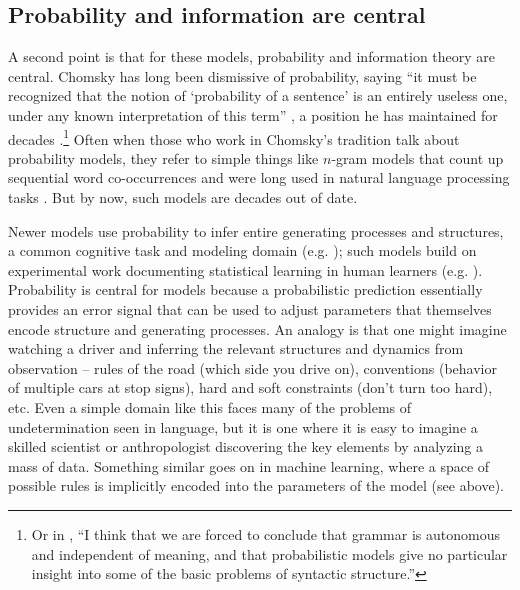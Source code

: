 \documentclass[output=paper,colorlinks,citecolor=brown]{langscibook}
\begin{document}
\subsection{Probability and information are central}

A second point is that for these models, probability and information theory are central. Chomsky has long been dismissive of probability, saying ``it must be recognized that the notion of ‘probability of a sentence’ is an entirely useless one, under any known interpretation of this term'' \citep{chomsky1969quine}, a position he has maintained for decades \citep{norvig2012colorless}.\footnote{Or in , ``I think that we are forced to conclude that grammar is autonomous and independent of meaning, and that probabilistic models give no particular insight into some of the basic problems of syntactic structure.''} Often when those who work in Chomsky's 
tradition talk about probability models, they refer to simple things like  $n$-gram models that count up sequential word co-occurrences and were long used in natural language processing tasks \citep{chen1999empirical,manning1999foundations}. But by now, such models are decades out of date. 

Newer models use probability to infer entire generating processes and structures, a common cognitive task and modeling domain (e.g. \citealt{tenenbaum2011grow,ullman2012theory,lake2015human,goodman2011learning,lake2017building,rule2020child,kemp2008discovery,yang2022one}); such models build on experimental work documenting statistical learning in human learners (e.g. \citealt{saffran1996statistical,saffran1996word,aslin1998computation,newport2004learning,aslin2012statistical}). Probability is central for models because a probabilistic prediction essentially provides an error signal that can be used to adjust parameters that themselves encode structure and  generating processes. An analogy is that one might imagine watching a driver and inferring the relevant structures and dynamics from observation -- rules of the road (which side you drive on), conventions (behavior of multiple cars at stop signs), hard and soft constraints (don't turn too hard), etc. Even a simple domain like this faces many of the problems of undetermination seen in language, but it is one where it is easy to imagine a skilled scientist or anthropologist discovering the key elements by analyzing a mass of data. Something similar goes on in machine learning, where a space of possible rules is implicitly encoded into the parameters of the model (see above). 
\end{document}
